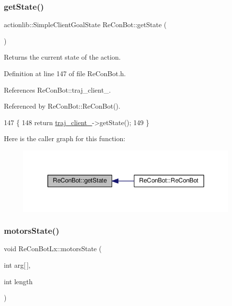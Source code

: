 \subsubsection{\texorpdfstring{get\+State()}{getState()}}
{\footnotesize\ttfamily actionlib\+::\+Simple\+Client\+Goal\+State Re\+Con\+Bot\+::get\+State (\begin{DoxyParamCaption}{ }\end{DoxyParamCaption})\hspace{0.3cm}{\ttfamily [inherited]}}



Returns the current state of the action. 



Definition at line 147 of file Re\+Con\+Bot.\+h.



References Re\+Con\+Bot\+::traj\+\_\+client\+\_\+.



Referenced by Re\+Con\+Bot\+::\+Re\+Con\+Bot().


\begin{DoxyCode}
147                                                  \{
148   \textcolor{keywordflow}{return} \hyperlink{class_re_con_bot_a14a35ad6ca284af7db7228d7872720d1}{traj\_client\_}->getState();
149 \}
\end{DoxyCode}
Here is the caller graph for this function\+:
\nopagebreak
\begin{figure}[H]
\begin{center}
\leavevmode
\includegraphics[width=336pt]{d9/d0b/class_re_con_bot_a3d9656755c06ded1f3b88ce05565f758_icgraph}
\end{center}
\end{figure}
\mbox{\label{class_re_con_bot_lx_a0e25f573057755c6729ea572362652e6}} 
\subsubsection{\texorpdfstring{motors\+State()}{motorsState()}}
{\footnotesize\ttfamily void Re\+Con\+Bot\+Lx\+::motors\+State (\begin{DoxyParamCaption}\item[{int}]{arg\mbox{[}$\,$\mbox{]},  }\item[{int}]{length }\end{DoxyParamCaption})}



